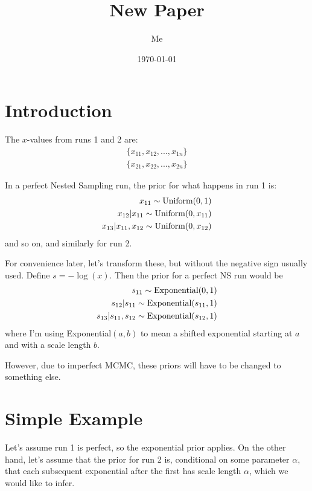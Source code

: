 \documentclass[a4paper, 11pt]{article}
\title{New Paper}
\author{Me}
\date{\today}
\begin{document}
\maketitle


\section{Introduction}
The $x$-values from runs 1 and 2 are:
\begin{eqnarray}
\{x_{11}, x_{12}, ..., x_{1n}\}\\
\{x_{21}, x_{22}, ..., x_{2n}\}
\end{eqnarray}

In a perfect Nested Sampling run, the prior for what happens in run 1 is:
\begin{eqnarray}
x_{11} \sim \textnormal{Uniform}(0, 1)\\
x_{12} | x_{11} \sim \textnormal{Uniform}(0, x_{11})\\
x_{13} | x_{11}, x_{12} \sim \textnormal{Uniform}(0, x_{12})
\end{eqnarray}
and so on, and similarly for run 2.

For convenience later, let's transform these, but without the negative sign
usually used. Define $s=-\log(x)$. Then the prior for a perfect NS run would be
\begin{eqnarray}
s_{11} \sim \textnormal{Exponential}(0, 1)\\
s_{12} | s_{11} \sim \textnormal{Exponential}(s_{11}, 1)\\
s_{13} | s_{11}, s_{12} \sim \textnormal{Exponential}(s_{12}, 1)
\end{eqnarray}
where I'm using Exponential$(a, b)$ to mean a shifted exponential starting
at $a$ and with a scale length $b$.

However, due to imperfect MCMC, these priors will have to be changed to
something else.

\section{Simple Example}
Let's assume run 1 is perfect, so the exponential prior applies. On the other
hand, let's assume that the prior for run 2 is, conditional on some parameter
$\alpha$, that each subsequent exponential after the first has scale
length $\alpha$, which we would like to infer.

\end{document}
